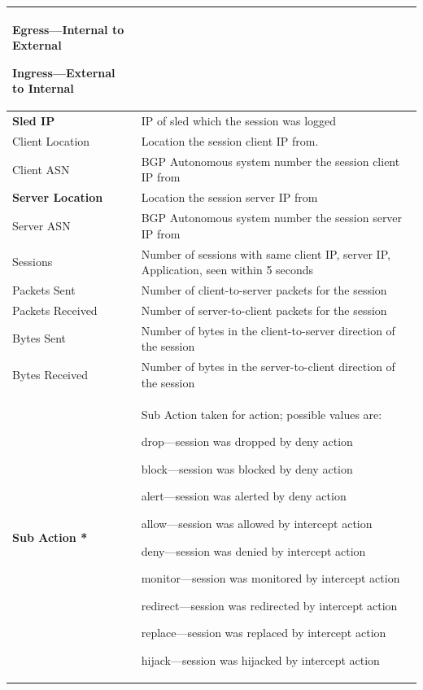 \begin{longtable}{p{}|p{}}
                    Egress—Internal to External


                    Ingress—External to Internal 
                \\\hline
    \textbf{Sled IP} &	IP of sled which the session was logged \\\hline
    Client Location &	Location the session client IP from.\\\hline
    Client ASN &	BGP Autonomous system number the session client IP from\\\hline
    \textbf{Server Location} &	Location the session server IP from\\\hline
    Server ASN &	BGP Autonomous system number the session server IP from\\\hline
    Sessions &	Number of sessions with same client IP, server IP, Application, seen within 5 seconds\\\hline
    Packets Sent &	Number of client-to-server packets for the session\\\hline
    Packets Received &	Number of server-to-client packets for the session\\\hline
    Bytes Sent &	Number of bytes in the client-to-server direction of the session\\\hline
    Bytes Received &	Number of bytes in the server-to-client direction of the session\\\hline
    \textbf{Sub Action *} &	Sub Action taken for action; possible values are:


                            drop—session was dropped by deny action


                            block—session was blocked by deny action


                            alert—session was alerted by deny action


                            allow—session was allowed by intercept action


                            deny—session was denied by intercept action


                            monitor—session was monitored by intercept action


                            redirect—session was redirected by intercept action


                            replace—session was replaced by intercept action


                            hijack—session was hijacked by intercept action



\end{longtable}
